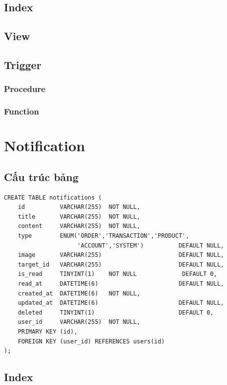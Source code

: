 \subsection{Index}

\subsection{View}

\subsection{Trigger}

\subsubsection{Procedure}

\subsubsection{Function}

\section{Notification}

\subsection{Cấu trúc bảng}

\begin{verbatim}
CREATE TABLE notifications (
    id          VARCHAR(255)  NOT NULL,
    title       VARCHAR(255)  NOT NULL,
    content     VARCHAR(255)  NOT NULL,
    type        ENUM('ORDER','TRANSACTION','PRODUCT',
                     'ACCOUNT','SYSTEM')          DEFAULT NULL,
    image       VARCHAR(255)                      DEFAULT NULL,
    target_id   VARCHAR(255)                      DEFAULT NULL,
    is_read     TINYINT(1)    NOT NULL             DEFAULT 0,
    read_at     DATETIME(6)                       DEFAULT NULL,
    created_at  DATETIME(6)   NOT NULL,
    updated_at  DATETIME(6)                       DEFAULT NULL,
    deleted     TINYINT(1)                        DEFAULT 0,
    user_id     VARCHAR(255)  NOT NULL,
    PRIMARY KEY (id),
    FOREIGN KEY (user_id) REFERENCES users(id)
);
\end{verbatim}

\subsection{Index}

